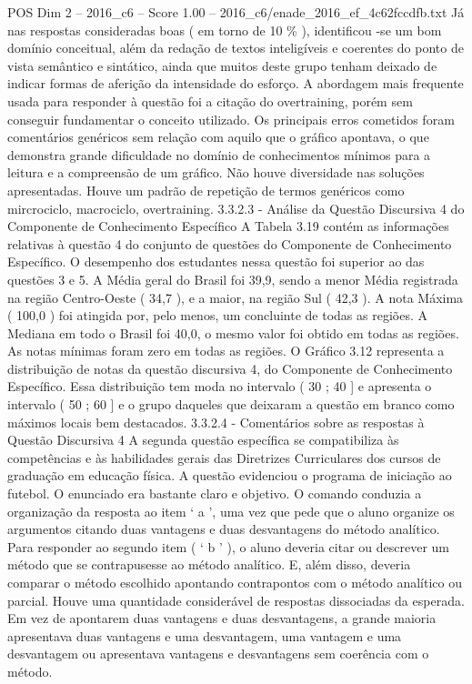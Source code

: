 \begin{textsample}{POS Dim 2 – 2016\_c6 – Score 1.00 – 2016\_c6/enade\_2016\_ef\_4c62fccdfb.txt}
Já nas respostas consideradas boas ( em torno de 10 \% ), identificou -se um bom domínio conceitual, além da redação de textos inteligíveis e coerentes do ponto de vista semântico e sintático, ainda que muitos deste grupo tenham deixado de indicar formas de aferição da intensidade do esforço.
A abordagem mais frequente usada para responder à questão foi a citação do overtraining, porém sem conseguir fundamentar o conceito utilizado.
Os principais erros cometidos foram comentários genéricos sem relação com aquilo que o gráfico apontava, o que demonstra grande dificuldade no domínio de conhecimentos mínimos para a leitura e a compreensão de um gráfico.
Não houve diversidade nas soluções apresentadas.
Houve um padrão de repetição de termos genéricos como mircrociclo, macrociclo, overtraining. 3.3.2.3 - Análise da Questão Discursiva 4 do Componente de Conhecimento Específico A Tabela 3.19 contém as informações relativas à questão 4 do conjunto de questões do Componente de Conhecimento Específico.
O desempenho dos estudantes nessa questão foi superior ao das questões 3 e 5.
A Média geral do Brasil foi 39,9, sendo a menor Média registrada na região Centro-Oeste ( 34,7 ), e a maior, na região Sul ( 42,3 ).
A nota Máxima ( 100,0 ) foi atingida por, pelo menos, um concluinte de todas as regiões.
A Mediana em todo o Brasil foi 40,0, o mesmo valor foi obtido em todas as regiões.
As notas mínimas foram zero em todas as regiões.
O Gráfico 3.12 representa a distribuição de notas da questão discursiva 4, do Componente de Conhecimento Específico.
Essa distribuição tem moda no intervalo ( 30 ; 40 ] e apresenta o intervalo ( 50 ; 60 ] e o grupo daqueles que deixaram a questão em branco como máximos locais bem destacados. 3.3.2.4 - Comentários sobre as respostas à Questão Discursiva 4 A segunda questão específica se compatibiliza às competências e às habilidades gerais das Diretrizes Curriculares dos cursos de graduação em educação física.
A questão evidenciou o programa de iniciação ao futebol.
O enunciado era bastante claro e objetivo.
O comando conduzia a organização da resposta ao item ‘ a ’, uma vez que pede que o aluno organize os argumentos citando duas vantagens e duas desvantagens do método analítico.
Para responder ao segundo item ( ‘ b ’ ), o aluno deveria citar ou descrever um método que se contrapusesse ao método analítico.
E, além disso, deveria comparar o método escolhido apontando contrapontos com o método analítico ou parcial.
Houve uma quantidade considerável de respostas dissociadas da esperada.
Em vez de apontarem duas vantagens e duas desvantagens, a grande maioria apresentava duas vantagens e uma desvantagem, uma vantagem e uma desvantagem ou apresentava vantagens e desvantagens sem coerência com o método.

\end{textsample}
